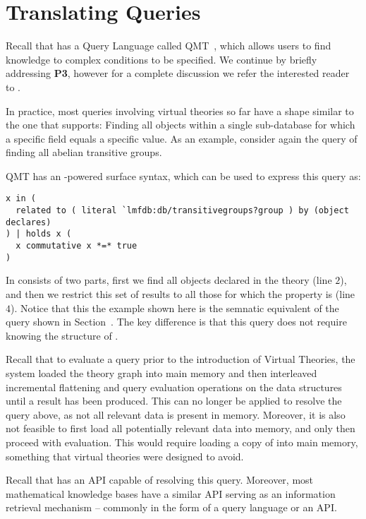\section{Translating Queries}\label{sec:qmt}
Recall that \mmt has a Query Language called QMT~\cite{Rabe:qlfml12}, which allows users to find knowledge to complex conditions to be specified. 
We continue by briefly addressing \textbf{P3}, however for a complete discussion we refer the interested reader to \cite{twiesing:msc17}. 

In practice, most queries involving virtual theories so far have a shape similar to the one that \lmfdb supports: 
Finding all objects within a single sub-database for which a specific field equals a specific value. 
As an example, consider again the query of finding all abelian transitive groups. 
 
QMT has an \mmt-powered surface syntax, which can be used to express this query as:
\begin{lstlisting}[language=qmt]
x in (
  related to ( literal `lmfdb:db/transitivegroups?group ) by (object declares)
) | holds x (
  x commutative x *=* true
)
\end{lstlisting}
In consists of two parts, first we find all objects declared in the  theory (line $2$), and then we restrict this set of results to all those for which the  property is  (line $4$). 
Notice that this the example shown here is the semnatic equivalent of the \lmfdb query shown in Section~\label{sec:sota:api}. 
The key difference is that this query does not require knowing the structure of \lmfdb. 

Recall that to evaluate a query prior to the introduction of Virtual Theories, the \mmt system loaded the theory graph into main memory and then interleaved incremental flattening and query evaluation operations on the \mmt data structures until a result has been produced. 
This can no longer be applied to resolve the query above, as not all relevant data is present in memory. 
Moreover, it is also not feasible to first load all potentially relevant data into memory, and only then proceed with evaluation. 
This would require loading a copy of \lmfdb into main memory, something that virtual
theories were designed to avoid. 

Recall that \lmfdb has an API capable of resolving this query. 
Moreover, most mathematical knowledge bases have a similar API serving as an information retrieval mechanism -- commonly in the form of a query language or an API. 

